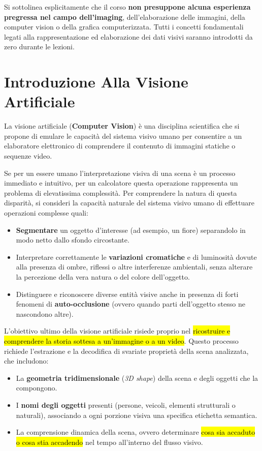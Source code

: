 ﻿\documentclass[11pt, a4paper]{article}
\begin{document}
Si sottolinea esplicitamente che il corso \textbf{non presuppone alcuna esperienza pregressa nel campo dell'imaging}, dell'elaborazione delle immagini, della computer vision o della grafica computerizzata. Tutti i concetti fondamentali legati alla rappresentazione ed elaborazione dei dati visivi saranno introdotti da zero durante le lezioni.

\newpage

\section{Introduzione Alla Visione Artificiale}

La visione artificiale (\textbf{Computer Vision}) è una disciplina scientifica che si propone di emulare le capacità del sistema visivo umano per consentire a un elaboratore elettronico di comprendere il contenuto di immagini statiche o sequenze video.

Se per un essere umano l'interpretazione visiva di una scena è un processo immediato e intuitivo, per un calcolatore questa operazione rappresenta un problema di elevatissima complessità. Per comprendere la natura di questa disparità, si consideri la capacità naturale del sistema visivo umano di effettuare operazioni complesse quali:
\begin{itemize}[noitemsep]
    \item \textbf{Segmentare} un oggetto d'interesse (ad esempio, un fiore) separandolo in modo netto dallo sfondo circostante.
    \item Interpretare correttamente le \textbf{variazioni cromatiche} e di luminosità dovute alla presenza di ombre, riflessi o altre interferenze ambientali, senza alterare la percezione della vera natura o del colore dell'oggetto.
    \item Distinguere e riconoscere diverse entità visive anche in presenza di forti fenomeni di \textbf{auto-occlusione} (ovvero quando parti dell'oggetto stesso ne nascondono altre).
\end{itemize}


L'obiettivo ultimo della visione artificiale risiede proprio nel \hl{ricostruire e comprendere la storia sottesa a un'immagine o a un video}. Questo processo richiede l'estrazione e la decodifica di svariate proprietà della scena analizzata, che includono:
\begin{itemize}[noitemsep]
    \item La \textbf{geometria tridimensionale} (\emph{3D shape}) della scena e degli oggetti che la compongono.
    \item I \textbf{nomi degli oggetti} presenti (persone, veicoli, elementi strutturali o naturali), associando a ogni porzione visiva una specifica etichetta semantica.
    \item La comprensione dinamica della scena, ovvero determinare \hl{cosa sia accaduto o cosa stia accadendo} nel tempo all'interno del flusso visivo.
\end{itemize}
\end{document}
